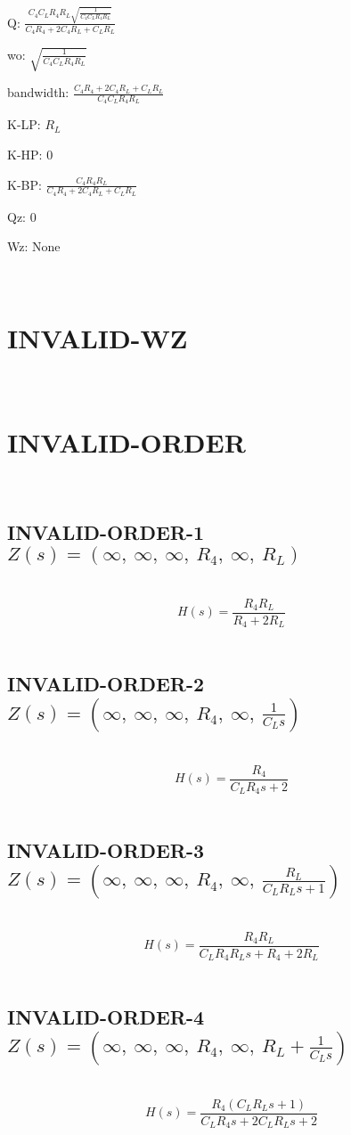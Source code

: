 \documentclass{article}
\begin{document}
Q: $\frac{C_{4} C_{L} R_{4} R_{L} \sqrt{\frac{1}{C_{4} C_{L} R_{4} R_{L}}}}{C_{4} R_{4} + 2 C_{4} R_{L} + C_{L} R_{L}}$\ 

wo: $\sqrt{\frac{1}{C_{4} C_{L} R_{4} R_{L}}}$\ 

bandwidth: $\frac{C_{4} R_{4} + 2 C_{4} R_{L} + C_{L} R_{L}}{C_{4} C_{L} R_{4} R_{L}}$\ 

K-LP: $R_{L}$\ 

K-HP: $0$\ 

K-BP: $\frac{C_{4} R_{4} R_{L}}{C_{4} R_{4} + 2 C_{4} R_{L} + C_{L} R_{L}}$\ 

Qz: $0$\ 

Wz: $\text{None}$\ 

\ 

\section{INVALID-WZ}\ 
\section{INVALID-ORDER}\ 
\subsection{INVALID-ORDER-1 $Z(s) = \left( \infty, \  \infty, \  \infty, \  R_{4}, \  \infty, \  R_{L}\right)$ } \ 
\textbf{\[H(s) = \frac{R_{4} R_{L}}{R_{4} + 2 R_{L}}\] } \ 
\subsection{INVALID-ORDER-2 $Z(s) = \left( \infty, \  \infty, \  \infty, \  R_{4}, \  \infty, \  \frac{1}{C_{L} s}\right)$ } \ 
\textbf{\[H(s) = \frac{R_{4}}{C_{L} R_{4} s + 2}\] } \ 
\subsection{INVALID-ORDER-3 $Z(s) = \left( \infty, \  \infty, \  \infty, \  R_{4}, \  \infty, \  \frac{R_{L}}{C_{L} R_{L} s + 1}\right)$ } \ 
\textbf{\[H(s) = \frac{R_{4} R_{L}}{C_{L} R_{4} R_{L} s + R_{4} + 2 R_{L}}\] } \ 
\subsection{INVALID-ORDER-4 $Z(s) = \left( \infty, \  \infty, \  \infty, \  R_{4}, \  \infty, \  R_{L} + \frac{1}{C_{L} s}\right)$ } \ 
\textbf{\[H(s) = \frac{R_{4} \left(C_{L} R_{L} s + 1\right)}{C_{L} R_{4} s + 2 C_{L} R_{L} s + 2}\] } \ 
\end{document}
